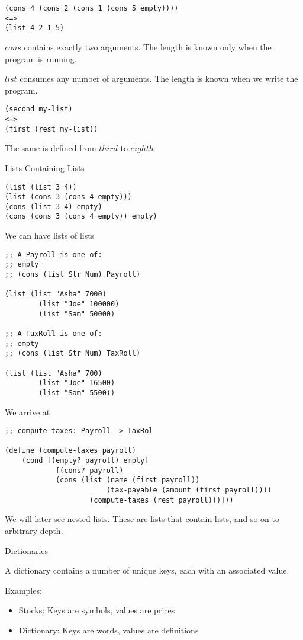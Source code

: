 \documentclass{article}
\begin{document}
\begin{lstlisting}
(cons 4 (cons 2 (cons 1 (cons 5 empty))))
<=>
(list 4 2 1 5)
\end{lstlisting}

$cons$ contains exactly two arguments. The length is known only when the program is running. 

$list$ consumes any number of arguments. The length is known when we write the program. 

\begin{lstlisting}
(second my-list)
<=>
(first (rest my-list))
\end{lstlisting}
The same is defined from $third$ to $eighth$

\underline{Lists Containing Lists}

\begin{lstlisting}
(list (list 3 4))
(list (cons 3 (cons 4 empty)))
(cons (list 3 4) empty)
(cons (cons 3 (cons 4 empty)) empty)
\end{lstlisting}


We can have lists of lists

\begin{lstlisting}
;; A Payroll is one of:
;; empty
;; (cons (list Str Num) Payroll)

(list (list "Asha" 7000)
        (list "Joe" 100000)
        (list "Sam" 50000)

;; A TaxRoll is one of:
;; empty
;; (cons (list Str Num) TaxRoll)

(list (list "Asha" 700)
        (list "Joe" 16500)
        (list "Sam" 5500))
\end{lstlisting}

We arrive at
\begin{lstlisting}
;; compute-taxes: Payroll -> TaxRol

(define (compute-taxes payroll)
    (cond [(empty? payroll) empty]
            [(cons? payroll)
            (cons (list (name (first payroll))
                        (tax-payable (amount (first payroll))))
                    (compute-taxes (rest payroll)))]))
\end{lstlisting}

We will later see nested lists. These are lists that contain lists, and so on to arbitrary depth. 

\underline{Dictionaries}

A dictionary contains a number of unique keys, each with an associated value. 

Examples:
\begin{itemize}
    \item Stocks: Keys are symbols, values are prices
    \item Dictionary: Keys are words, values are definitions
\end{itemize}
\end{document}
